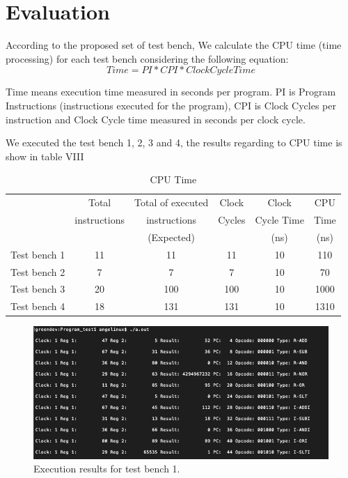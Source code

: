 \documentclass[conference]{IEEEtran}
\begin{document}
\section{Evaluation}

According to the proposed set of test bench, We calculate the CPU time \cite{b3} (time processing) for each test bench considering the following equation:
\[Time = PI * CPI * Clock Cycle Time\] 

Time means execution time measured in seconds per program. PI is Program Instructions (instructions executed for the program), CPI is Clock Cycles per instruction and Clock Cycle time measured in seconds per clock cycle.

We executed the test bench 1, 2, 3 and 4, the results regarding to CPU time is show in table VIII

\begin{table}[h]
	\caption{CPU Time} %
	\begin{center}
		\begin{tabular}{|c|c|c|c|c|c|}
			\hline
			&Total&Total of executed&Clock&Clock&CPU\\
			&instructions&instructions&Cycles&Cycle Time&Time\\
			&&(Expected)&&(ns)&(ns)\\
			\hline
			Test bench 1&11&11&11&10&110\\
			\hline
			Test bench 2&7&7&7&10&70\\
			\hline
			Test bench 3&20&100&100&10&1000\\
			\hline
			Test bench 4&18&131&131&10&1310\\
			\hline
		\end{tabular}
		\label{tab_test3}
	\end{center}
\end{table}

\begin{figure}[h]
\includegraphics[scale=0.33]{test_bench_1.png}
\caption{Execution results for test bench 1.}
\label{result1}
\end{figure}
\end{document}
